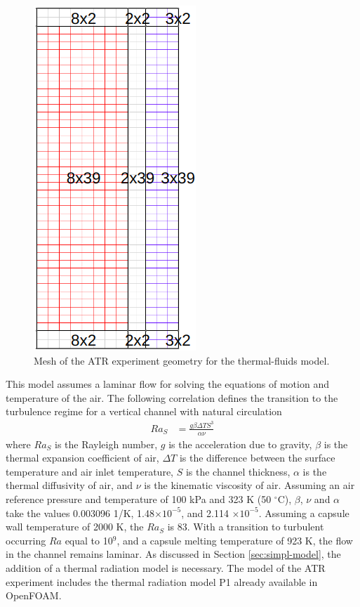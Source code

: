 \begin{figure}[htbp!] %
  \centering
  \includegraphics[width=0.25\linewidth]{figures/atr-mesh}
  \hfill
  \caption{Mesh of the ATR experiment geometry for the thermal-fluids model.}
  \label{fig:atr-msh}
\end{figure}

This model assumes a laminar flow for solving the equations of motion and temperature of the air.
The following correlation defines the transition to the turbulence regime for a vertical channel with natural circulation \cite{incropera_fundamentals_2006}
\begin{align}
Ra_S &= \frac{g \beta \Delta T S^3}{\alpha \nu}
\end{align}
where $Ra_{S}$ is the Rayleigh number, $g$ is the acceleration due to gravity, $\beta$ is the thermal expansion coefficient of air, $\Delta T$ is the difference between the surface temperature and air inlet temperature, $S$ is the channel thickness, $\alpha$ is the thermal diffusivity of air, and $\nu$ is the kinematic viscosity of air.
Assuming an air reference pressure and temperature of 100 kPa and 323 K (50 $^\circ$C), $\beta$, $\nu$ and $\alpha$ take the values 0.003096 1/K, 1.48$\times 10^{-5}$, and 2.114 $\times 10^{-5}$.
Assuming a capsule wall temperature of 2000 K, the $Ra_S$ is 83.
With a transition to turbulent occurring $Ra$ equal to 10$^9$, and a capsule melting temperature of 923 K, the flow in the channel remains laminar.
As discussed in Section \ref{sec:simpl-model}, the addition of a thermal radiation model is necessary.
The model of the ATR experiment includes the thermal radiation model P1 already available in OpenFOAM.

